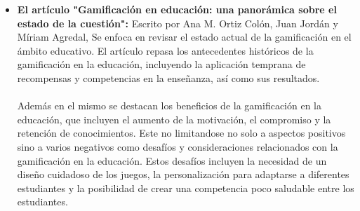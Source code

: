 \begin{itemize}
    \item \textbf{El artículo "Gamificación en educación: una panorámica sobre el estado de la cuestión":} Escrito por Ana M. Ortiz Colón, Juan Jordán y Míriam Agredal, Se enfoca en revisar el estado actual de la gamificación en el ámbito educativo. El artículo repasa los antecedentes históricos de la gamificación en la educación, incluyendo la aplicación temprana de recompensas y competencias en la enseñanza, así como sus resultados. 
    \\ \\
Además en el mismo se destacan los beneficios de la gamificación en la educación, que incluyen el aumento de la motivación, el compromiso y la retención de conocimientos. Este no limitandose no solo a aspectos positivos sino a varios negativos como desafíos y consideraciones relacionados con la gamificación en la educación. Estos desafíos incluyen la necesidad de un diseño cuidadoso de los juegos, la personalización para adaptarse a diferentes estudiantes y la posibilidad de crear una competencia poco saludable entre los estudiantes.\cite{n}

\end{itemize}

